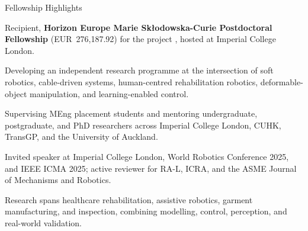 \begin{rubric}{Fellowship Highlights}

\entry*[Funding]
    Recipient, \textbf{Horizon Europe Marie Sk\l{}odowska-Curie Postdoctoral Fellowship} (EUR~276,187.92) for the project , hosted at Imperial College London.

\entry*[Research]
    Developing an independent research programme at the intersection of soft robotics, cable-driven systems, human-centred rehabilitation robotics, deformable-object manipulation, and learning-enabled control.

\entry*[Leadership]
    Supervising MEng placement students and mentoring undergraduate, postgraduate, and PhD researchers across Imperial College London, CUHK, TransGP, and the University of Auckland.

\entry*[Visibility]
    Invited speaker at Imperial College London, World Robotics Conference 2025, and IEEE ICMA 2025; active reviewer for RA-L, ICRA, and the ASME Journal of Mechanisms and Robotics.

\entry*[Translation]
    Research spans healthcare rehabilitation, assistive robotics, garment manufacturing, and inspection, combining modelling, control, perception, and real-world validation.

\end{rubric}
